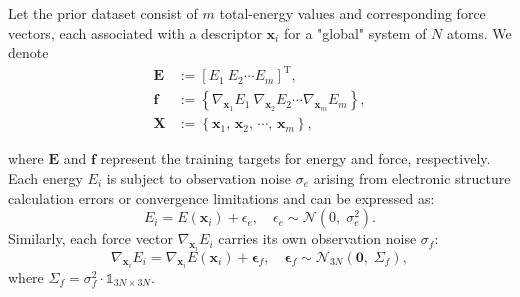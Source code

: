 Let the prior dataset consist of $m$ total-energy values and corresponding force vectors, each associated with a descriptor $\mathbf{x}_i$ for a "global" system of $N$ atoms. We denote
\begin{subequations}
\begin{align} 
   \label{equ:3.10a} 
   \mathbf{E} &:= \left[E_{1}\:E_{2}\cdots E_{m} \right]^{\text{T}},\\
   \label{equ:3.10b} 
   \mathbf{f} &:= \left\{\nabla_{\mathbf{x}_{1}} E_{1}\:\nabla_{\mathbf{x}_{2}} E_{2}\cdots \nabla_{\mathbf{x}_{m}} E_{m} \right\},\\
   \label{equ:3.10c} 
   \mathbf{X} &:= \left\{\mathbf{x}_{1},\, \mathbf{x}_{2},\, \cdots,\, \mathbf{x}_{m} \right\},
\end{align}
\end{subequations}

where $\mathbf{E}$ and $\mathbf{f}$ represent the training targets for energy and force, respectively.
Each energy $E_i$ is subject to observation noise $\sigma_{e}$ arising from electronic structure calculation errors or convergence limitations and can be expressed as:
\begin{equation}
    \label{equ:3.11}
E_{i} = E(\mathbf{x}_{i}) + \epsilon_{e}, \quad \epsilon_{e} \sim \mathcal{N}(0,\;\sigma_{e}^{2}).
\end{equation}
Similarly, each force vector $\nabla_{\mathbf{x}_{i}} E_i$ carries its own observation noise $\sigma_{f}$:
\begin{equation}
    \label{equ:3.12}
\nabla_{\mathbf{x}_{i}} E_{i} = \nabla_{\mathbf{x}_{i}} E(\mathbf{x}_{i}) + \boldsymbol\epsilon_{f}, \quad \boldsymbol\epsilon_{f} \sim \mathcal{N}_{3N}(\mathbf{0},\;\Sigma_{f} ),
\end{equation}
where $\Sigma_{f} = \sigma^{2}_{f}\cdot\mathbb{1}_{3N\times 3N}$.

